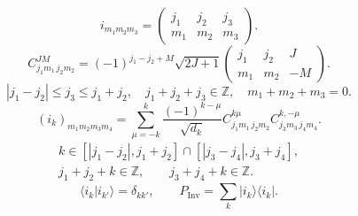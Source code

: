 \documentclass{article}
\newcommand{\ket}[1]{\lvert #1\rangle}
\newcommand{\bra}[1]{\langle #1\rvert}
\newcommand{\Inv}{\operatorname{Inv}}
\begin{document}
\begin{equation}
i_{m_1m_2m_3}=\begin{pmatrix}j_1&j_2&j_3\\m_1&m_2&m_3\end{pmatrix}.
\tag{I1}
\end{equation}
\begin{equation}
C^{JM}_{j_1m_1\,j_2m_2}=(-1)^{j_1-j_2+M}\sqrt{2J+1}\begin{pmatrix}j_1&j_2&J\\m_1&m_2&-M\end{pmatrix}.
\tag{I2}
\end{equation}
\begin{equation}
|j_1-j_2|\le j_3\le j_1+j_2,\quad j_1+j_2+j_3\in\mathbb Z,\quad m_1+m_2+m_3=0.
\tag{I3}
\end{equation}
\begin{equation}
(i_k)_{m_1m_2m_3m_4}=\sum_{\mu=-k}^k\frac{(-1)^{k-\mu}}{\sqrt{d_k}}C^{k\mu}_{j_1m_1\,j_2m_2}C^{k,-\mu}_{j_3m_3\,j_4m_4}.
\tag{I4}
\end{equation}
\begin{equation}
\begin{gathered}
k\in[|j_1-j_2|,j_1+j_2]\cap[|j_3-j_4|,j_3+j_4],\\
j_1+j_2+k\in\mathbb Z,\qquad j_3+j_4+k\in\mathbb Z.
\end{gathered}
\tag{I5}
\end{equation}
\begin{equation}
\langle i_k|i_{k'}\rangle=\delta_{kk'},\qquad P_{\Inv}=\sum_k\ket{i_k}\bra{i_k}.
\tag{I6}
\end{equation}
\end{document}
